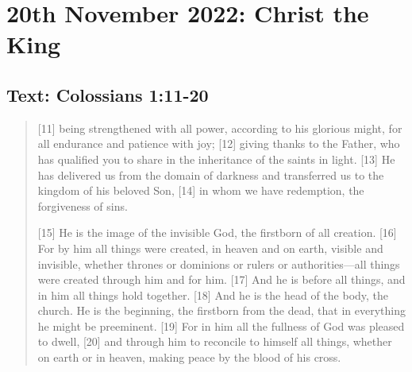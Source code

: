 \section{20th November 2022: Christ the King}
\subsection*{Text: Colossians 1:11-20}
  \begin{quote}
    [11] being strengthened with all power, according to his glorious might,
    for all endurance and patience with joy; [12] giving thanks to the
    Father, who has qualified you to share in the inheritance of the saints
    in light.  [13] He has delivered us from the domain of darkness and
    transferred us to the kingdom of his beloved Son, [14] in whom we have
    redemption, the forgiveness of sins.

    [15] He is the image of the invisible God, the firstborn of all creation.
    [16] For by him all things were created, in heaven and on earth, visible
    and invisible, whether thrones or dominions or rulers or authorities—all
    things were created through him and for him.  [17] And he is before all
    things, and in him all things hold together.  [18] And he is the head of
    the body, the church.  He is the beginning, the firstborn from the dead,
    that in everything he might be preeminent.  [19] For in him all the
    fullness of God was pleased to dwell, [20] and through him to reconcile
    to himself all things, whether on earth or in heaven, making peace by the
    blood of his cross.
  \end{quote}

